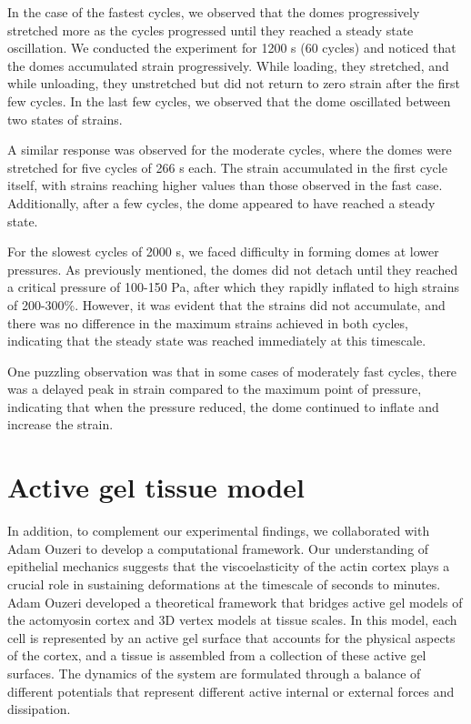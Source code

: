 In the case of the fastest cycles, we observed that the domes
progressively stretched more as the cycles progressed until they reached
a steady state oscillation. We conducted the experiment for 1200 s (60
cycles) and noticed that the domes accumulated strain progressively.
While loading, they stretched, and while unloading, they unstretched but
did not return to zero strain after the first few cycles. In the last
few cycles, we observed that the dome oscillated between two states of
strains.

A similar response was observed for the moderate cycles, where the domes
were stretched for five cycles of 266 s each. The strain accumulated in
the first cycle itself, with strains reaching higher values than those
observed in the fast case. Additionally, after a few cycles, the dome
appeared to have reached a steady state.

For the slowest cycles of 2000 s, we faced difficulty in forming domes
at lower pressures. As previously mentioned, the domes did not detach
until they reached a critical pressure of 100-150 Pa, after which they
rapidly inflated to high strains of 200-300\%. However, it was evident
that the strains did not accumulate, and there was no difference in the
maximum strains achieved in both cycles, indicating that the steady
state was reached immediately at this timescale.

One puzzling observation was that in some cases of moderately fast
cycles, there was a delayed peak in strain compared to the maximum point
of pressure, indicating that when the pressure reduced, the dome
continued to inflate and increase the strain.

\hypertarget{active-gel-tissue-model}{%
	\section{Active gel tissue model}\label{active-gel-tissue-model}}

In addition, to complement our experimental findings, we collaborated
with Adam Ouzeri to develop a computational framework. Our understanding
of epithelial mechanics suggests that the viscoelasticity of the actin
cortex plays a crucial role in sustaining deformations at the timescale
of seconds to minutes. Adam Ouzeri developed a theoretical framework
that bridges active gel models of the actomyosin cortex and 3D vertex
models at tissue scales. In this model, each cell is represented by an
active gel surface that accounts for the physical aspects of the cortex,
and a tissue is assembled from a collection of these active gel
surfaces. The dynamics of the system are formulated through a balance of
different potentials that represent different active internal or
external forces and dissipation.

